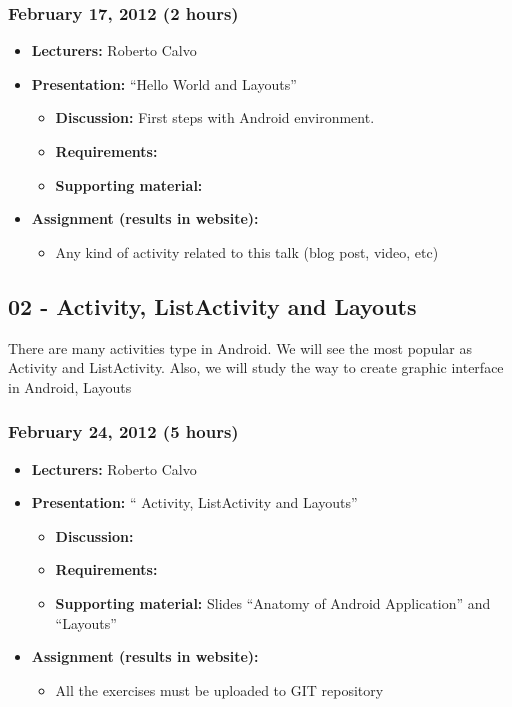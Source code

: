 \documentclass[a4paper]{article}
\begin{document}

\subsubsection{February 17, 2012 (2 hours)}

\begin{itemize}
\item \textbf{Lecturers:} Roberto Calvo
\item \textbf{Presentation:} ``Hello World and Layouts''
  \begin{itemize}
  \item \textbf{Discussion:} First steps with Android environment.
  \item \textbf{Requirements:} 
  \item \textbf{Supporting material:}
  \end{itemize}
\item \textbf{Assignment (results in website):}
  \begin{itemize}
  \item Any kind of activity
    related to this talk (blog post, video, etc)
  \end{itemize}
\end{itemize}


\subsection{02 - Activity, ListActivity and Layouts}

There are many activities type in Android. We will see the most
popular as Activity and ListActivity. Also, we will study the way to
create graphic interface in Android, Layouts

\subsubsection{February 24, 2012 (5 hours)}

\begin{itemize}
\item \textbf{Lecturers:} Roberto Calvo
\item \textbf{Presentation:} `` Activity, ListActivity and Layouts''
  \begin{itemize}
  \item \textbf{Discussion:}
  \item \textbf{Requirements:} 
  \item \textbf{Supporting material:} Slides ``Anatomy of Android
    Application'' and ``Layouts''
  \end{itemize}
\item \textbf{Assignment (results in website):} 
  \begin{itemize}
  \item All the exercises must be uploaded to GIT repository
  \end{itemize}
\end{itemize}
\end{document}
